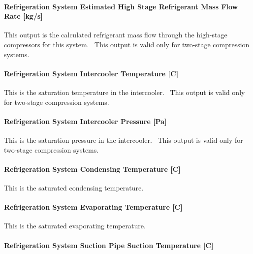 \paragraph{Refrigeration System Estimated High Stage Refrigerant Mass Flow Rate {[}kg/s{]}}\label{refrigeration-system-estimated-high-stage-refrigerant-mass-flow-rate-kgs}

This output is the calculated refrigerant mass flow through the high-stage compressors for this system.~ This output is valid only for two-stage compression systems.

\paragraph{Refrigeration System Intercooler Temperature {[}C{]}}\label{refrigeration-system-intercooler-temperature-c}

This is the saturation temperature in the intercooler.~ This output is valid only for two-stage compression systems.

\paragraph{Refrigeration System Intercooler Pressure {[}Pa{]}}\label{refrigeration-system-intercooler-pressure-pa}

This is the saturation pressure in the intercooler.~ This output is valid only for two-stage compression systems.

\paragraph{Refrigeration System Condensing Temperature {[}C{]}}\label{refrigeration-system-condensing-temperature-c}

This is the saturated condensing temperature.

\paragraph{Refrigeration System Evaporating Temperature {[}C{]}}\label{refrigeration-system-evaporating-temperature-c}

This is the saturated evaporating temperature.

\paragraph{Refrigeration System Suction Pipe Suction Temperature {[}C{]}}\label{refrigeration-system-suction-pipe-suction-temperature-c}

